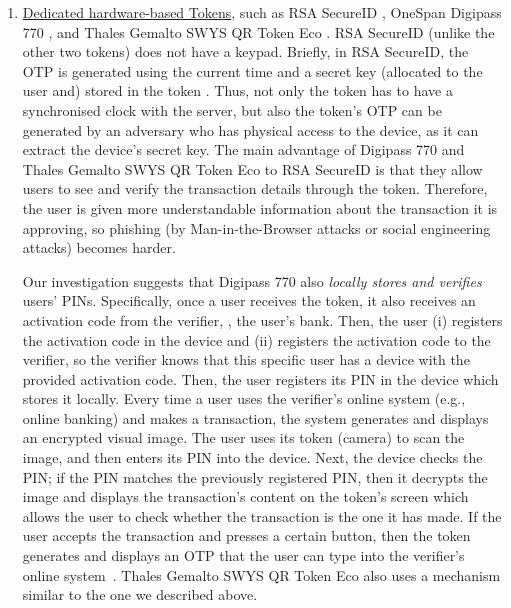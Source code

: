 \begin{enumerate}
\item \underline{Dedicated hardware-based Tokens}, such as RSA SecureID \cite{secureID}, OneSpan Digipass 770 \cite{Digipass-website}, and Thales Gemalto SWYS QR Token Eco \cite{Gemalto}.   RSA SecureID (unlike the other two tokens) does not have a keypad. Briefly, in RSA SecureID, the OTP is generated using the current time and a secret key (allocated to the user and) stored in the token \cite{biryukov2003cryptanalysis}. Thus, not only the token has to have a synchronised clock with the server, but also the token's OTP can be generated by an adversary who has physical access to the device, as it can extract the device's secret key.  The main advantage of  Digipass 770 and Thales Gemalto SWYS QR Token Eco to RSA SecureID is that they allow users to see and verify the transaction details through the token. Therefore, the user is given more understandable information about the transaction it is approving,
so phishing (by Man-in-the-Browser attacks or social engineering attacks) becomes harder. 

 

Our investigation suggests that Digipass 770 also \emph{locally stores and verifies} users' PINs. 
%
Specifically, once a user receives the token, it also receives an activation code from the verifier, \eg, the user's bank.  Then, the user (i) registers the activation code in the device and (ii) registers the activation code to the verifier, so the verifier knows that this specific user has a device with the provided activation code. Then, the user registers its PIN in the device which stores it locally. Every time a user uses the verifier's online system  (e.g., online banking) and makes a transaction, the system generates and displays an encrypted visual image. The user uses its token (camera) to scan the image, and then enters its PIN into the device. Next, the device checks the PIN; if the PIN matches the previously registered PIN, then it decrypts the image and displays the transaction's content on the token's screen which allows the user to check whether the transaction is the one it has made. If the user accepts the transaction and presses a certain button, then the token generates and displays an OTP that the user can type into the verifier's online system~\cite{Digipass-website}.  Thales Gemalto SWYS QR Token Eco also uses a mechanism similar to the one we described above. 


\end{enumerate}
